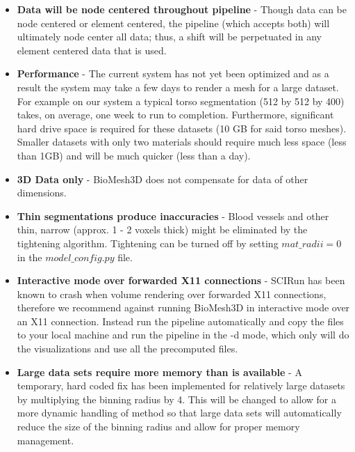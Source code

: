 \documentclass[fleqn,12pt,openany]{book}
\begin{document}
\begin{itemize} 
  \item{\bf Data will be node centered throughout pipeline} - Though data 
  can be node centered or element centered, the pipeline (which accepts both) 
  will ultimately node center all data; thus, a shift will be perpetuated in 
  any element centered data that is used.
  
  
  \item{\bf Performance } - The current system has not yet been optimized and as
  a result the system may take a few days to render a mesh for a large dataset.
  For example on our system a typical torso segmentation (512 by 512 by 400) takes,
  on average, one week to run to completion.  Furthermore, significant hard drive
  space is required for these datasets (10 GB for said torso meshes).  
  Smaller datasets with only two materials should require much 
  less space (less than 1GB) and will be much quicker (less than a day).

 \item{\bf 3D Data only} - BioMesh3D does not compensate for data of other 
 dimensions.
 
 \item{\bf Thin segmentations produce inaccuracies} - Blood vessels and other thin,
   narrow (approx. 1 - 2 voxels thick) might be eliminated by the tightening algorithm.
   Tightening can be turned off by setting $mat\_radii = 0$ in the $model\_config.py$ file.
 
  \item{\bf Interactive mode over forwarded X11 connections} - SCIRun has been 
  known to crash when volume rendering over forwarded X11 connections, therefore
  we recommend against running BioMesh3D in interactive mode over an X11 connection.
  Instead run the pipeline automatically and copy the files to your local machine
  and run the pipeline in the -d mode, which only will do the visualizations and
  use all the precomputed files.
  
  \item{\bf Large data sets require more memory than is available} - A temporary, hard coded 
  fix has been implemented for relatively large datasets by multiplying the binning radius by 4.  
  This will be changed to allow for a more dynamic handling of method so that large data sets
  will automatically reduce the size of the binning radius and allow for proper memory 
  management.

\end{itemize} 
\end{document}
